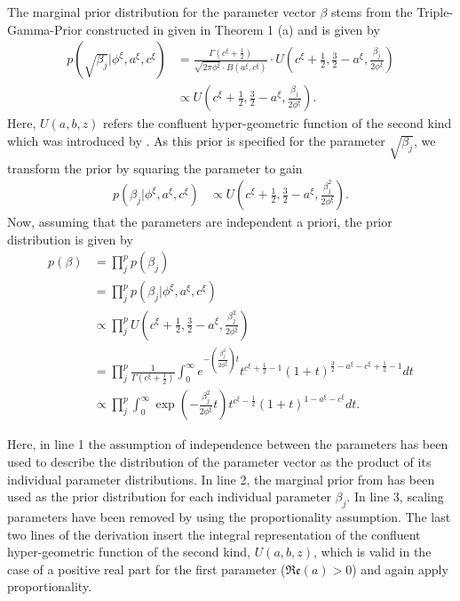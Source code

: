 \documentclass[12pt,a4paper]{article}
\begin{document}
The marginal prior distribution for the parameter vector $\beta$ stems from the Triple-Gamma-Prior constructed in \textcite{TGP2020} given in Theorem 1 (a) and is given by
\begin{align*}
p(\sqrt{\beta_j}|\phi^\xi, a^\xi, c^\xi) &= \frac{\Gamma(c^\xi + \frac{1}{2})}{\sqrt{2\pi \phi^\xi}\cdot B(a^\xi, c^\xi)}\cdot U\left(c^\xi + \frac{1}{2}, \frac{3}{2}-a^\xi, \frac{\beta_j}{2\phi^\xi}\right)\\
&\propto U\left(c^\xi + \frac{1}{2}, \frac{3}{2}-a^\xi, \frac{\beta_j}{2\phi^\xi}\right).
\end{align*}
Here, $U(a,b,z)$ refers the confluent hyper-geometric function of the second kind which was introduced by \textcite{Tricomi1947}. As this prior is specified for the parameter $\sqrt{\beta_j}$, we transform the prior by squaring the parameter to gain
\begin{align*}
p(\beta_j|\phi^\xi, a^\xi, c^\xi) &\propto U\left(c^\xi + \frac{1}{2}, \frac{3}{2}-a^\xi, \frac{\beta_j^2}{2\phi^\xi}\right).
\end{align*}
Now, assuming that the parameters are independent a priori, the prior distribution is given by
\begin{align}
p(\beta) 	&= \prod_j^p p(\beta_j) \nonumber\\
			&= \prod_j^p p(\beta_j|\phi^\xi, a^\xi, c^\xi) \nonumber\\
			&\propto \prod_j^p U\left(c^\xi + \frac{1}{2}, \frac{3}{2}-a^\xi, \frac{\beta_j^2}{2\phi^\xi}\right) \nonumber\\
			&= \prod_j^p \frac{1}{\Gamma(c^\xi + \frac{1}{2})}\int_0^\infty e^{-(\frac{\beta_j^2}{2\phi^\xi})t}t^{c^\xi + \frac{1}{2}-1}(1+t)^{\frac{3}{2}-a^\xi-c^\xi + \frac{1}{2}-1}dt \nonumber\\
			&\propto \prod_j^p \int_0^\infty \exp\left(-\frac{\beta_j^2}{2\phi^\xi}t\right)t^{c^\xi - \frac{1}{2}}(1+t)^{1-a^\xi-c^\xi} dt. \label{eq:prior}
\end{align}

Here, in line 1 the assumption of independence between the parameters has been used to describe the distribution of the parameter vector as the product of its individual parameter distributions. In line 2, the marginal prior from \textcite{TGP2020} has been used as the prior distribution for each individual parameter $\beta_j$. In line 3, scaling parameters have been removed by using the proportionality assumption. The last two lines of the derivation insert the integral representation of the confluent hyper-geometric function of the second kind, $U(a,b,z)$, which is valid in the case of a positive real part for the first parameter ($\mathfrak{Re}(a) > 0$) and again apply proportionality.\\
\end{document}
